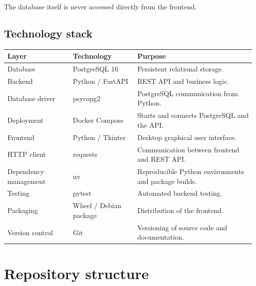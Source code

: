 \documentclass[a4paper,11pt]{article}
\begin{document}
The database itself is never accessed directly from the frontend.

\subsection{Technology stack}

\renewcommand{\arraystretch}{1.2}

\begin{tabularx}{\linewidth}{@{}p{3cm}p{4cm}X@{}}
\toprule
\textbf{Layer} & \textbf{Technology} & \textbf{Purpose} \\
\midrule

Database
  & PostgreSQL 16
  & Persistent relational storage. \\

Backend
  & Python / FastAPI
  & REST API and business logic. \\

Database driver
  & psycopg2
  & PostgreSQL communication from Python. \\

Deployment
  & Docker Compose
  & Starts and connects PostgreSQL and the API. \\

Frontend
  & Python / Tkinter
  & Desktop graphical user interface. \\

HTTP client
  & requests
  & Communication between frontend and REST API. \\

Dependency management
  & uv
  & Reproducible Python environments and package builds. \\

Testing
  & pytest
  & Automated backend testing. \\

Packaging
  & Wheel / Debian package
  & Distribution of the frontend. \\

Version control
  & Git
  & Versioning of source code and documentation. \\

\bottomrule
\end{tabularx}

\section{Repository structure}
\end{document}
